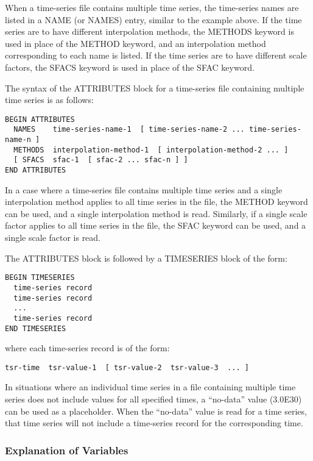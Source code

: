 When a time-series file contains multiple time series, the time-series names are listed in a NAME (or NAMES) entry, similar to the example above. If the time series are to have different interpolation methods, the METHODS keyword is used in place of the METHOD keyword, and an interpolation method corresponding to each name is listed. If the time series are to have different scale factors, the SFACS keyword is used in place of the SFAC keyword. 

The syntax of the ATTRIBUTES block for a time-series file containing multiple time series is as follows:

\begin{lstlisting}[style=blockdefinition]
BEGIN ATTRIBUTES
  NAMES    time-series-name-1  [ time-series-name-2 ... time-series-name-n ]
  METHODS  interpolation-method-1  [ interpolation-method-2 ... ]
  [ SFACS  sfac-1  [ sfac-2 ... sfac-n ] ]
END ATTRIBUTES
\end{lstlisting}

In a case where a time-series file contains multiple time series and a single interpolation method applies to all time series in the file, the METHOD keyword can be used, and a single interpolation method is read. Similarly, if a single scale factor applies to all time series in the file, the SFAC keyword can be used, and a single scale factor is read.

The ATTRIBUTES block is followed by a TIMESERIES block of the form:
\begin{lstlisting}[style=blockdefinition]
BEGIN TIMESERIES
  time-series record
  time-series record
  ...
  time-series record
END TIMESERIES
\end{lstlisting}

\noindent where each time-series record is of the form:\\
\begin{lstlisting}[style=blockdefinition]
  tsr-time  tsr-value-1  [ tsr-value-2  tsr-value-3  ... ]
\end{lstlisting}

In situations where an individual time series in a file containing multiple time series does not include values for all specified times, a ``no-data'' value (3.0E30) can be used as a placeholder. When the ``no-data'' value is read for a time series, that time series will not include a time-series record for the corresponding time.

\subsubsection{Explanation of Variables}

